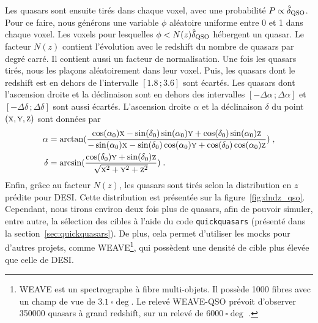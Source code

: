 Les quasars sont ensuite tirés dans chaque voxel, avec une probabilité $P \propto \hat \delta_{\textsc{QSO}}$. Pour ce faire, nous générons une variable $\phi$ aléatoire uniforme entre 0 et 1 dans chaque voxel. Les voxels pour lesquelles $\phi < N(z) \hat \delta_{\textsc{QSO}}$ hébergent un quasar.
Le facteur $N(z)$ contient l'évolution avec le redshift du nombre de quasars par degré carré. Il contient aussi un facteur de normalisation.
Une fois les quasars tirés, nous les plaçons aléatoirement dans leur voxel.
Puis, les quasars dont le redshift est en dehors de l'intervalle $[\num{1.8}\, ; \num{3.6}]$ sont écartés.
Les quasars dont l'ascension droite et la déclinaison sont en dehors des intervalles $[ - \Delta \alpha \, ; \Delta \alpha]$ et $[ - \Delta \delta \, ; \Delta \delta]$ sont aussi écartés.
L'ascension droite $\alpha$ et la déclinaison $\delta$ du point $(\textsc{x},\textsc{y},\textsc{z})$ sont données par
\begin{align}
  \label{eq:radec}
  \alpha &= \arctan(\frac{
  \cos(\alpha_0)\textsc{x} - \sin(\delta_0)\sin(\alpha_0)\textsc{y} + \cos(\delta_0)\sin(\alpha_0)\textsc{z}
  }{
  - \sin(\alpha_0)\textsc{x} - \sin(\delta_0)\cos(\alpha_0)\textsc{y} + \cos(\delta_0)\cos(\alpha_0)\textsc{z}
           }) \; ,\\
  \delta &= \arcsin(\frac{
           \cos(\delta_0)\textsc{y} + \sin(\delta_0) \textsc{z}
           }{
           \sqrt{\textsc{x}^2 + \textsc{y}^2 + \textsc{z}^2}
           }) \; .
\end{align}
Enfin, grâce au facteur $N(z)$, les quasars sont tirés selon la distribution en $z$ prédite pour DESI. Cette distribution est présentée sur la figure~\ref{fig:dndz_qso}. Cependant, nous tirons environ deux fois plus de quasars, afin de pouvoir simuler, entre autre, la sélection des cibles à l'aide du code \texttt{quickquasars} (présenté dans la section~\ref{sec:quickquasars}). De plus, cela permet d'utiliser les mocks pour d'autres projets, comme WEAVE\footnote{WEAVE est un spectrographe à fibre multi-objets. Il possède \num{1000} fibres avec un champ de vue de $\SI{3.1}{\square\deg}$. Le relevé WEAVE-QSO prévoit d'observer \num{350000} quasars à grand redshift, sur un relevé de $\SI{6000}{\square\deg}$ \autocite{Pieri2016}.}, qui possèdent une densité de cible plus élevée que celle de DESI.
